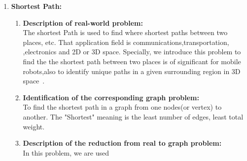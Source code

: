 \documentclass[article, 10pt,onecolumn]{article}
\begin{document}
\begin{enumerate}
\begin{enumerate}
  \end{enumerate}  
\item \textbf{Shortest Path:} 
\begin{enumerate}   
   \item \textbf{Description of real-world problem:}\\
    The shortest Path is used to find where shortest paths between two places, etc. That application field is communications,transportation,
    ,electronics and 2D or 3D space. Specially, we introduce this problem to find the the shortest path between two places is of significant
    for mobile robots,also to identify unique paths in a given surrounding region in 3D space~\cite{Mobile}.
   \item \textbf{Identification of the corresponding graph problem:}\\
    To find the shortest path in a graph from one nodes(or vertex) to another. The "Shortest" meaning is the least number of edges, least
    total weight.    
   \item \textbf{Description of the reduction from real to graph problem:}\\
    In this problem, we are used 
   
\end{enumerate}
 

\end{enumerate}
\end{document}
